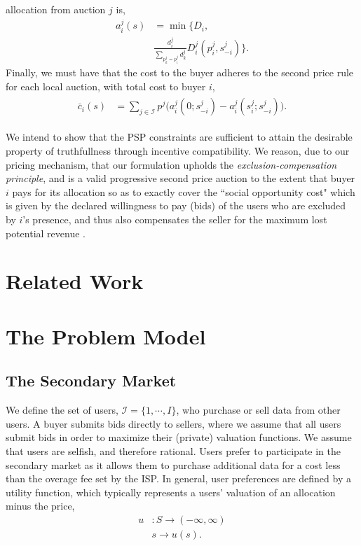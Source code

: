\documentclass[12pt]{article}
\theoremstyle{definition}
\newcommand{\mcI}{\mathcal{I}}
\begin{document}
\begin{multicols}{2}
allocation from auction $j$ is,
\begin{align}\label{dataallocation}
    a_i^j(s) &= \min\bigg\lbrace D_i, \\
    &\frac{d_i^j}{\sum_{p_k^j= p_i^j}d_k^j} D_i^j(p_i^j,s_{-i}^j)\bigg\rbrace.
\end{align}
Finally, we must have that the cost to the buyer adheres to the second price
rule for each local auction, with total cost to buyer $i$,
\begin{align}\label{datacost}
\begin{split}
    \bar{c}_i(s) &= \displaystyle\sum_{j\in\mcI} 
p^j \bigg(a_i^j(0; s_{-i}^j)
    -a_i^j(s_i^j;s_{-i}^j)\bigg).
\end{split}
\end{align}


We intend to show that the PSP constraints are
sufficient to attain the desirable property of truthfullness through incentive compatibility. We
reason, due to our pricing mechanism, that our formulation upholds the \emph{exclusion-compensation
principle}, and is a valid progressive second price auction to the extent that buyer $i$
pays for its allocation so as to exactly cover the ``social opportunity cost"
which is given by the declared willingness to pay (bids) of the users who are
excluded by $i$'s presence, and thus also compensates the seller for the maximum lost potential
revenue \cite{lazar}.


\section{Related Work}

\section{The Problem Model}
\subsection{The Secondary Market}

We define the set of users, $\mcI = \lbrace 1, \cdots, I\rbrace$, who purchase or sell
data from other users. A buyer submits bids directly to sellers, where we
assume that all users submit bids in order to maximize their
(private) valuation functions. 
We assume that users are selfish, and therefore
rational. Users prefer to participate in the secondary market as it allows them to purchase
additional data for a cost less than the overage fee set by the ISP. 
In general, user preferences are defined by a utility function, which typically
represents a users' valuation of an allocation minus the price, 
\begin{align*}
    u &: S \rightarrow (-\infty, \infty) \\
          & s \rightarrow u(s).
\end{align*}


\end{multicols}
\end{document}
